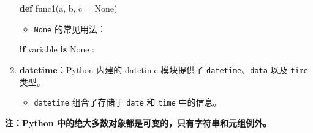 \documentclass[]{article}
\newenvironment{Shaded}{}{}
\newcommand{\KeywordTok}[1]{\textcolor[rgb]{0.00,0.44,0.13}{\textbf{#1}}}
\newcommand{\DecValTok}[1]{\textcolor[rgb]{0.25,0.63,0.44}{#1}}
\newcommand{\SpecialCharTok}[1]{\textcolor[rgb]{0.25,0.44,0.63}{#1}}
\newcommand{\StringTok}[1]{\textcolor[rgb]{0.25,0.44,0.63}{#1}}
\newcommand{\CommentTok}[1]{\textcolor[rgb]{0.38,0.63,0.69}{\textit{#1}}}
\newcommand{\VariableTok}[1]{\textcolor[rgb]{0.10,0.09,0.49}{#1}}
\newcommand{\ControlFlowTok}[1]{\textcolor[rgb]{0.00,0.44,0.13}{\textbf{#1}}}
\newcommand{\OperatorTok}[1]{\textcolor[rgb]{0.40,0.40,0.40}{#1}}
\newcommand{\NormalTok}[1]{#1}
\begin{document}
\begin{enumerate}
\begin{Shaded}
\begin{Highlighting}[]
\KeywordTok{def}\NormalTok{ func1(a, b, c }\OperatorTok{=} \VariableTok{None}\NormalTok{)}
\end{Highlighting}
\end{Shaded}

  \begin{itemize}
  \item
    \texttt{None} 的常见用法：
  \end{itemize}

\begin{Shaded}
\begin{Highlighting}[]
\ControlFlowTok{if}\NormalTok{ variable }\KeywordTok{is} \VariableTok{None}\NormalTok{ :}
\end{Highlighting}
\end{Shaded}
\item
  \textbf{datetime}：Python 内建的 datetime 模块提供了
  \texttt{datetime}、\texttt{data} 以及 \texttt{time} 类型。

  \begin{itemize}
  \item
    \texttt{datetime} 组合了存储于 \texttt{date} 和 \texttt{time}
    中的信息。
  \end{itemize}
\end{enumerate}

\begin{Shaded}
\end{Shaded}

\textbf{注：Python 中的绝大多数对象都是可变的，只有字符串和元组例外。}
\end{document}
